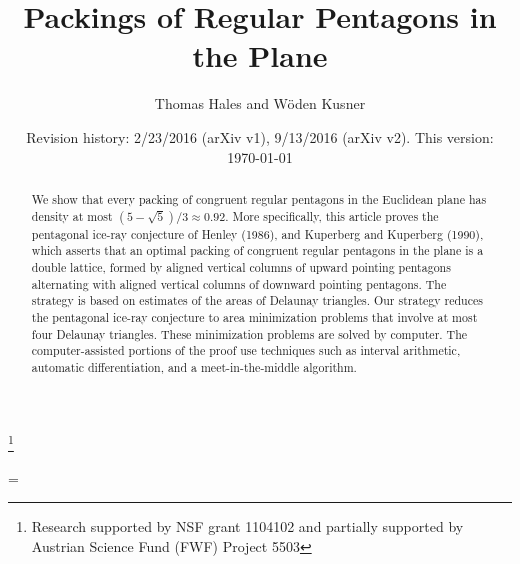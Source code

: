 \documentclass{amsart}
\theoremstyle{plain}
\theoremstyle{definition}
\theoremstyle{remark}
\begin{document}
\title
    {Packings of Regular Pentagons in the Plane}
\author{Thomas Hales and W\"oden Kusner}
\date{Revision history: 2/23/2016 (arXiv v1), 9/13/2016 (arXiv v2). This version: \today}
\thanks{Research supported by NSF grant 1104102 and partially supported by Austrian Science Fund (FWF) Project 5503}

\begin{abstract}  
We show that every packing of congruent regular pentagons in the Euclidean plane has
density at most $(5-\sqrt5)/3\approx 0.92$.     More specifically,
this article proves the pentagonal ice-ray
conjecture of Henley (1986), and Kuperberg and Kuperberg (1990), 
which asserts that an optimal packing of congruent regular pentagons in the plane is a double lattice,
formed by aligned vertical columns of upward pointing pentagons alternating
with aligned vertical columns of downward pointing pentagons.  The strategy is based on estimates
of the areas of Delaunay triangles.  Our strategy reduces the pentagonal ice-ray conjecture to
area minimization problems that involve at most four Delaunay triangles.  These minimization problems
are solved by computer.  The computer-assisted portions of the proof use techniques such as
interval arithmetic, automatic differentiation, and a meet-in-the-middle algorithm.
\end{abstract}


\parskip=\baselineskip

 \maketitle



    


      
%
      
       
%
      
      
%





%
\end{document}
